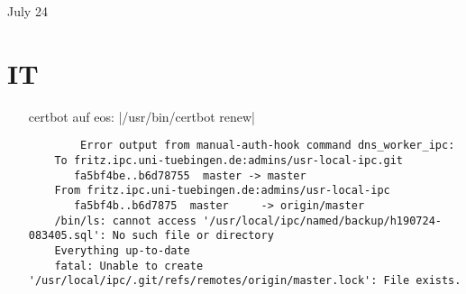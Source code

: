 \documentclass[11pt,letterpaper]{article}
\begin{document}
\logoPNG

{\Huge July 24}

\section*{IT}
\begin{itemize}
	\item[certbot] auf eos: |/usr/bin/certbot renew|
	\begin{verbatim}
	    Error output from manual-auth-hook command dns_worker_ipc:
    To fritz.ipc.uni-tuebingen.de:admins/usr-local-ipc.git                                                                                                                                                             
       fa5bf4be..b6d78755  master -> master                                                                                                                                                                            
    From fritz.ipc.uni-tuebingen.de:admins/usr-local-ipc                                                                                                                                                               
       fa5bf4b..b6d7875  master     -> origin/master                                                                                                                                                                   
    /bin/ls: cannot access '/usr/local/ipc/named/backup/h190724-083405.sql': No such file or directory                                                                                                                 
    Everything up-to-date                                                                                                                                                                                              
    fatal: Unable to create '/usr/local/ipc/.git/refs/remotes/origin/master.lock': File exists.                                                                                                                        


\end{verbatim}
\end{itemize}
\end{document}
